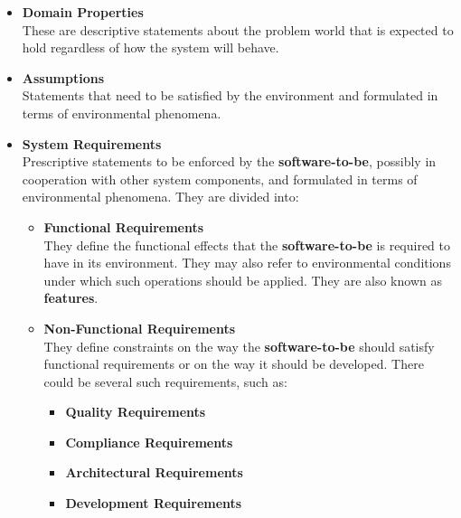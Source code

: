 \documentclass{article}
\begin{document}
\begin{itemize}
	\item \textbf{Domain Properties}
	\vspace{.2cm} \\
	These are descriptive statements about the problem world that is expected to hold regardless of how the system will behave.
	
	\item \textbf{Assumptions}
	\vspace{.2cm} \\
	Statements that need to be satisfied by the environment and formulated in terms of environmental phenomena.
	
	\item \textbf{System Requirements}
	\vspace{.2cm} \\
	Prescriptive statements to be enforced by the \textbf{software-to-be}, possibly in cooperation with other system components, and formulated in terms of environmental phenomena. They are divided into:
	
	\begin{itemize}
		\item \textbf{Functional Requirements}
		\vspace{.2cm} \\
		They define the functional effects that the \textbf{software-to-be} is required to have in its environment. They may also refer to environmental conditions under which such operations should be applied. They are also known as \textbf{features}.
		
		\item \textbf{Non-Functional Requirements}
		\vspace{.2cm} \\
		They define constraints on the way the \textbf{software-to-be} should satisfy functional requirements or on the way it should be developed. There could be several such requirements, such as:
		
		\begin{itemize}
			\item \textbf{Quality Requirements}
			\item \textbf{Compliance Requirements}
			\item \textbf{Architectural Requirements}
			\item \textbf{Development Requirements}
		\end{itemize}
	\end{itemize}
\end{itemize}
\end{document}
